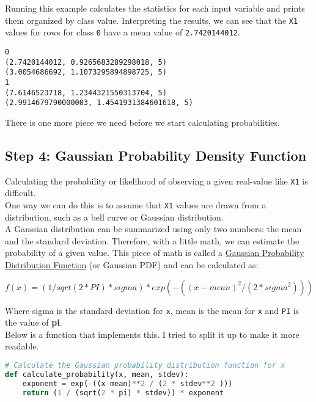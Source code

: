 \documentclass[12pt]{article}
\begin{document}
Running this example calculates the statistics for each input variable and prints them organized by class value. Interpreting the results, we can see that the \verb|X1| values for rows for class \verb|0| have a mean value of \verb|2.7420144012|.

\begin{lstlisting}
0
(2.7420144012, 0.9265683289298018, 5)
(3.0054686692, 1.1073295894898725, 5)
1
(7.6146523718, 1.2344321550313704, 5)
(2.9914679790000003, 1.4541931384601618, 5)

\end{lstlisting}

There is one more piece we need before we start calculating probabilities.

\newpage

\subsection{Step 4: Gaussian Probability Density Function}

Calculating the probability or likelihood of observing a given real-value like \verb|X1| is difficult.\\

One way we can do this is to assume that \verb|X1| values are drawn from a distribution, such as a bell curve or Gaussian distribution.\\

A Gaussian distribution can be summarized using only two numbers: the mean and the standard deviation. Therefore, with a little math, we can estimate the probability of a given value. This piece of math is called a \href{https://en.wikipedia.org/wiki/Gaussian_function}{Gaussian Probability Distribution Function} (or Gaussian PDF) and can be calculated as:\\

\begin{center}
    $ f(x) = (1 / sqrt(2 * PI) * sigma) * exp(-((x-mean)^2 / (2 * sigma^2))) $
\end{center}

Where sigma is the standard deviation for \verb|x|, mean is the mean for \verb|x| and \verb|PI| is the value of \textbf{pi}.\\

Below is a function that implements this. I tried to split it up to make it more readable.

\begin{lstlisting}[language=python]
# Calculate the Gaussian probability distribution function for x
def calculate_probability(x, mean, stdev):
	exponent = exp(-((x-mean)**2 / (2 * stdev**2 )))
	return (1 / (sqrt(2 * pi) * stdev)) * exponent

\end{lstlisting}
\end{document}
